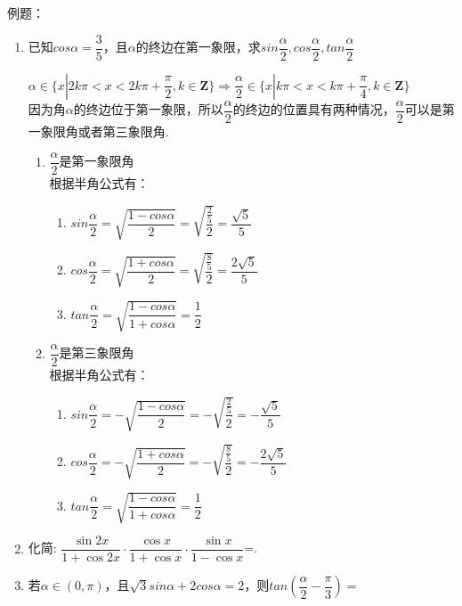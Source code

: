 例题：
\begin{enumerate}
    \item 已知$cos\alpha = \dfrac{3}{5}$，且$\alpha$的终边在第一象限，求$sin\dfrac{\alpha}{2}, cos\dfrac{\alpha}{2}, tan\dfrac{\alpha}{2}$
    \begin{jieda}
        $\alpha \in \{x| 2k\pi < x < 2k\pi + \dfrac{\pi}{2}, k\in \mathbf{Z} \} \Longrightarrow \dfrac{\alpha}{2} \in \{x| k\pi < x < k\pi + \dfrac{\pi}{4}, k\in \mathbf{Z} \}$ \\
        因为角$\alpha$的终边位于第一象限，所以$\dfrac{\alpha}{2}$的终边的位置具有两种情况，$\dfrac{\alpha}{2}$可以是第一象限角或者第三象限角.
        \begin{enumerate}
            \item $\dfrac{\alpha}{2}$是第一象限角 \\
            根据半角公式有：
            \begin{enumerate}
                \item $sin\dfrac{\alpha}{2} = \sqrt{\dfrac{1-cos\alpha}{2}} = \sqrt{\dfrac{\frac{2}{5}}{2}} = \dfrac{\sqrt{5}}{5}$
                \item $cos\dfrac{\alpha}{2} = \sqrt{\dfrac{1+cos\alpha}{2}} = \sqrt{\dfrac{\frac{8}{5}}{2}} = \dfrac{2\sqrt{5}}{5}$
                \item $tan\dfrac{\alpha}{2} = \sqrt{\dfrac{1-cos\alpha}{1+cos\alpha}} = \dfrac{1}{2}$
            \end{enumerate}
            \item $\dfrac{\alpha}{2}$是第三象限角 \\
                根据半角公式有：
            \begin{enumerate}
                \item $sin\dfrac{\alpha}{2} = -\sqrt{\dfrac{1-cos\alpha}{2}} = -\sqrt{\dfrac{\frac{2}{5}}{2}} = -\dfrac{\sqrt{5}}{5}$
                \item $cos\dfrac{\alpha}{2} = -\sqrt{\dfrac{1+cos\alpha}{2}} = -\sqrt{\dfrac{\frac{8}{5}}{2}} = -\dfrac{2\sqrt{5}}{5}$
                \item $tan\dfrac{\alpha}{2} = \sqrt{\dfrac{1-cos\alpha}{1+cos\alpha}} = \dfrac{1}{2}$
            \end{enumerate}
        \end{enumerate}
    \end{jieda}
    \item 化简: $\dfrac{\sin2x}{1+\cos2x}\cdot\dfrac{\cos{x}}{1+\cos{x}}\cdot\dfrac{\sin{x}}{1-\cos{x}}$=. 
    \item 若$\alpha \in (0, \pi)$，且$\sqrt{3}sin\alpha + 2 cos\alpha = 2$，则$tan\left(\dfrac{\alpha}{2} - \dfrac{\pi}{3}\right) = $

\end{enumerate}
